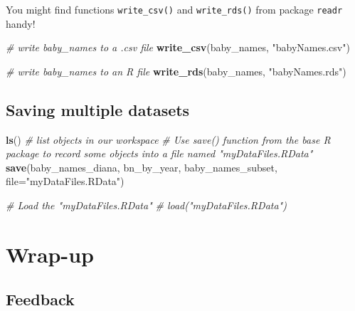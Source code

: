 \documentclass[
]{book}
\newenvironment{Shaded}{\begin{snugshade}}{\end{snugshade}}
\newcommand{\CommentTok}[1]{\textcolor[rgb]{0.56,0.35,0.01}{\textit{#1}}}
\newcommand{\DataTypeTok}[1]{\textcolor[rgb]{0.13,0.29,0.53}{#1}}
\newcommand{\KeywordTok}[1]{\textcolor[rgb]{0.13,0.29,0.53}{\textbf{#1}}}
\newcommand{\NormalTok}[1]{#1}
\newcommand{\StringTok}[1]{\textcolor[rgb]{0.31,0.60,0.02}{#1}}
\begin{document}
You might find functions \texttt{write\_csv()} and \texttt{write\_rds()} from package
\texttt{readr} handy!

\begin{Shaded}
\begin{Highlighting}[]
\CommentTok{\# write baby\_names to a .csv file}
\KeywordTok{write\_csv}\NormalTok{(baby\_names, }\StringTok{"babyNames.csv"}\NormalTok{)}
\end{Highlighting}
\end{Shaded}

\begin{Shaded}
\begin{Highlighting}[]
\CommentTok{\# write baby\_names to an R file}
\KeywordTok{write\_rds}\NormalTok{(baby\_names, }\StringTok{"babyNames.rds"}\NormalTok{)}
\end{Highlighting}
\end{Shaded}

\hypertarget{saving-multiple-datasets}{%
\subsection{Saving multiple datasets}\label{saving-multiple-datasets}}

\begin{Shaded}
\begin{Highlighting}[]
\KeywordTok{ls}\NormalTok{() }\CommentTok{\# list objects in our workspace}
\CommentTok{\# Use save() function from the base R package to record some objects into a file named "myDataFiles.RData"}
\KeywordTok{save}\NormalTok{(baby\_names\_diana, bn\_by\_year, baby\_names\_subset, }\DataTypeTok{file=}\StringTok{"myDataFiles.RData"}\NormalTok{)  }
\end{Highlighting}
\end{Shaded}

\begin{Shaded}
\begin{Highlighting}[]
\CommentTok{\# Load the "myDataFiles.RData"}
\CommentTok{\# load("myDataFiles.RData") }
\end{Highlighting}
\end{Shaded}

\hypertarget{wrap-up-1}{%
\section{Wrap-up}\label{wrap-up-1}}

\hypertarget{feedback-1}{%
\subsection{Feedback}\label{feedback-1}}
\end{document}
